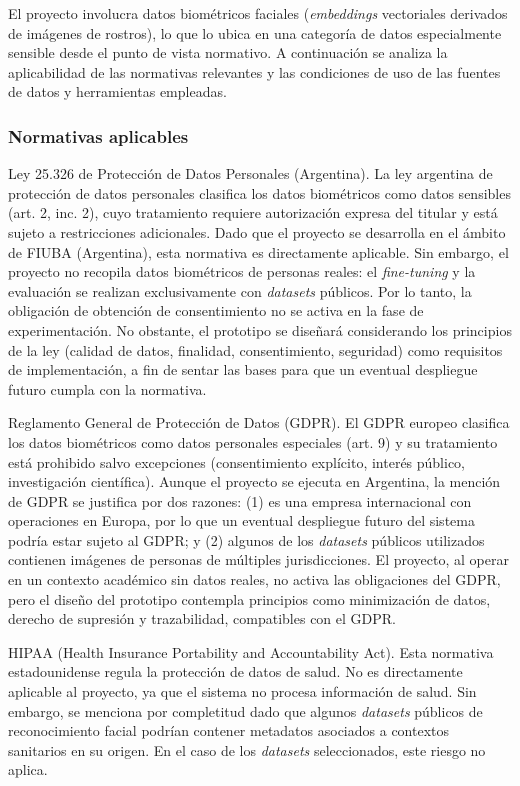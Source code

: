 \documentclass[
  11pt, %
]{charter}
\begin{document}
El proyecto involucra datos biométricos faciales (\textit{embeddings} vectoriales derivados de imágenes de rostros), lo que lo ubica en una categoría de datos especialmente sensible desde el punto de vista normativo. A continuación se analiza la aplicabilidad de las normativas relevantes y las condiciones de uso de las fuentes de datos y herramientas empleadas.

\subsubsection{Normativas aplicables}

Ley 25.326 de Protección de Datos Personales (Argentina). La ley argentina de protección de datos personales clasifica los datos biométricos como datos sensibles (art. 2, inc. 2), cuyo tratamiento requiere autorización expresa del titular y está sujeto a restricciones adicionales. Dado que el proyecto se desarrolla en el ámbito de FIUBA (Argentina), esta normativa es directamente aplicable. Sin embargo, el proyecto no recopila datos biométricos de personas reales: el \textit{fine-tuning} y la evaluación se realizan exclusivamente con \textit{datasets} públicos. Por lo tanto, la obligación de obtención de consentimiento no se activa en la fase de experimentación. No obstante, el prototipo se diseñará considerando los principios de la ley (calidad de datos, finalidad, consentimiento, seguridad) como requisitos de implementación, a fin de sentar las bases para que un eventual despliegue futuro cumpla con la normativa.

Reglamento General de Protección de Datos (GDPR). El GDPR europeo clasifica los datos biométricos como datos personales especiales (art. 9) y su tratamiento está prohibido salvo excepciones (consentimiento explícito, interés público, investigación científica). Aunque el proyecto se ejecuta en Argentina, la mención de GDPR se justifica por dos razones: (1) \empclientename\hspace{1px} es una empresa internacional con operaciones en Europa, por lo que un eventual despliegue futuro del sistema podría estar sujeto al GDPR; y (2) algunos de los \textit{datasets} públicos utilizados contienen imágenes de personas de múltiples jurisdicciones. El proyecto, al operar en un contexto académico sin datos reales, no activa las obligaciones del GDPR, pero el diseño del prototipo contempla principios como minimización de datos, derecho de supresión y trazabilidad, compatibles con el GDPR.

HIPAA (Health Insurance Portability and Accountability Act). Esta normativa estadounidense regula la protección de datos de salud. No es directamente aplicable al proyecto, ya que el sistema no procesa información de salud. Sin embargo, se menciona por completitud dado que algunos \textit{datasets} públicos de reconocimiento facial podrían contener metadatos asociados a contextos sanitarios en su origen. En el caso de los \textit{datasets} seleccionados, este riesgo no aplica.
\end{document}
